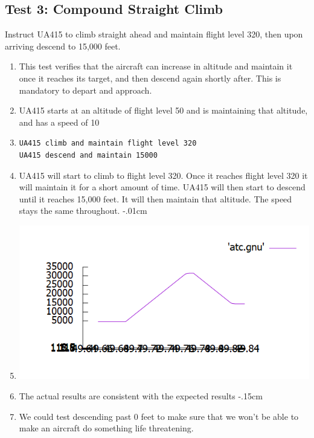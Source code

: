 \documentclass[letterpaper, 12pt]{article}
\begin{document}
\subsection{Test 3: Compound Straight Climb}
Instruct UA415 to climb straight ahead and maintain flight level 320, then upon arriving descend to 15,000 feet.
\begin{enumerate}\itemsep-.15cm

\item This test verifies that the aircraft can increase in altitude and maintain it once it reaches its target, and then descend again shortly after. This is mandatory to depart and approach.
\item UA415 starts at an altitude of flight level 50 and is maintaining that altitude, and has a speed of 10
\item \begin{verbatim}UA415 climb and maintain flight level 320
UA415 descend and maintain 15000
\end{verbatim}
\item UA415 will start to climb to flight level 320. Once it reaches flight level 320 it will maintain it for a short amount of time. UA415 will then start to descend until it reaches 15,000 feet. It will then maintain that altitude. The speed stays the same throughout.
\itemsep-.01cm
\item \includegraphics[scale=.55,valign=t,center]{test3.png}
\item The actual results are consistent with the expected results
\itemsep-.15cm
\item We could test descending past 0 feet to make sure that we won’t be able to make an aircraft do something life threatening.
\end{enumerate}
\end{document}
